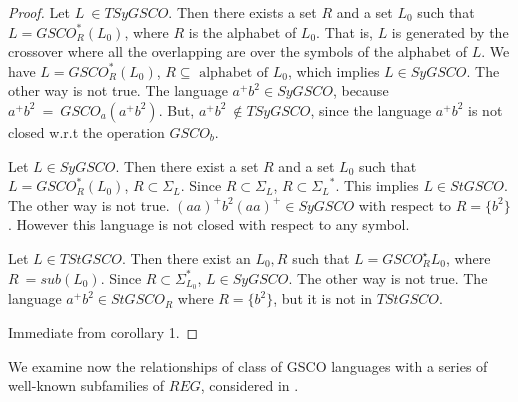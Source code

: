 \documentclass{llncs}
\begin{document}
\begin{proof}
Let $L~\in TSyGSCO$. Then there exists a set $R$ and a set $L_0$
such that $L=GSCO_R^*(L_0)$, where $R$ is the alphabet of $L_0$.
That is, $L$ is generated by the crossover where all the overlapping
are over the symbols of the alphabet of $L$. We have
$L=GSCO_R^*(L_0)$, $R \subseteq \mbox{~alphabet of~} L_0$, which
implies $L\in SyGSCO$. The other way is not true. The language
$a^+b^2\in SyGSCO$, because $a^+b^2~=~ GSCO_{a}(a^+b^2)$.  But,
$a^+b^2~ \notin TSyGSCO$, since the language $a^+b^2$ is not closed
w.r.t the operation $GSCO_b$.

\par Let $L\in SyGSCO$. Then there exist a set $R$ and a set $L_0$
such that $L=GSCO_R^*(L_0)$, $R\subset \Sigma_L$.  Since
$R\subset\Sigma_L$, $R\subset{\Sigma_L}^*$. This implies $L \in
StGSCO$. The other way is not true. $(aa)^+b^2(aa)^+\in SyGSCO$ with
respect to  $R=\{b^2\}$. However this language is not closed with
respect to any symbol.
\par  Let $L\in TStGSCO$. Then there exist an $L_0, R$ such
that
 $L=GSCO_R^\star{L_0}$, where $R~=sub(L_0)$.  Since $R \subset  \Sigma_{L_0}^*$,
  $L\in SyGSCO$. The other way is not true. The language $a^+b^2\in
  StGSCO_R$ where $R=\{b^2\}$, but it is not in $TStGSCO$.
\par Immediate from corollary 1.
\end{proof}
\par We examine now the relationships of class of GSCO languages with
a series of well-known subfamilies of $REG$, considered  in \cite{Mc,swat,MPS}.
\end{document}
